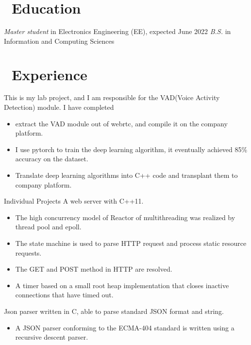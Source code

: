 \documentclass{resume}
\begin{document}



\section{\faGraduationCap\ Education}
\textit{Master student} in Electronics Engineering (EE), expected June 2022
\textit{B.S.} in Information and Computing Sciences

\section{\faUsers\ Experience}
\role{Intern}{}
This is my lab project, and I am responsible for the VAD(Voice Activity Detection) module. I have completed
\begin{itemize}
    \item extract the VAD module out of webrtc, and compile it on the company platform.
    \item I use pytorch to train the deep learning algorithm, it eventually achieved 85\% accuracy on the dataset.
    \item Translate deep learning algorithms into C++ code and transplant them to company platform.
\end{itemize}

{Individual Projects}
A web server with C++11.
\begin{itemize}
    \item The high concurrency model of Reactor of multithreading was realized by thread pool and epoll.
    \item The state machine is used to parse HTTP request and process static resource requests.
    \item The GET and POST method in HTTP are resolved.
    \item A timer based on a small root heap implementation that closes inactive connections that have timed out.
\end{itemize}

Json parser written in C, able to parse standard JSON format and string.
\begin{itemize}
    \item A JSON parser conforming to the ECMA-404 standard is written using a recursive descent parser.
\end{itemize}
\end{document}
